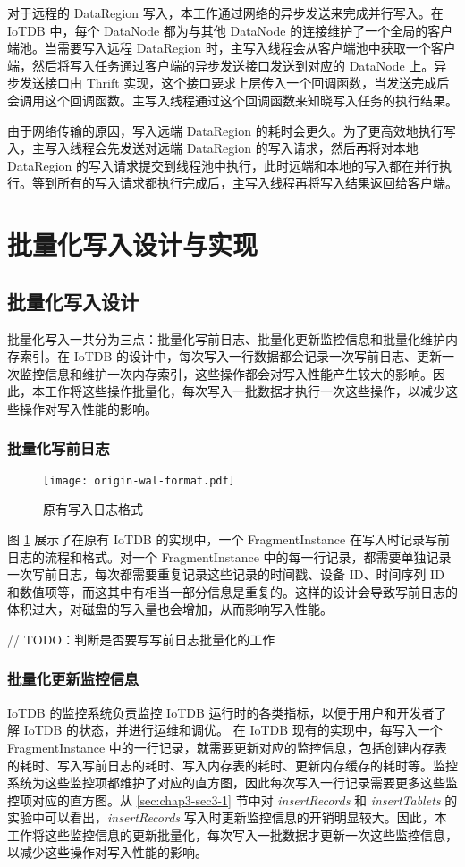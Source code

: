 对于远程的 DataRegion 写入，本工作通过网络的异步发送来完成并行写入。在 IoTDB 中，每个 DataNode 都为与其他 DataNode 的连接维护了一个全局的客户端池。当需要写入远程 DataRegion 时，主写入线程会从客户端池中获取一个客户端，然后将写入任务通过客户端的异步发送接口发送到对应的 DataNode 上。异步发送接口由 Thrift 实现，这个接口要求上层传入一个回调函数，当发送完成后会调用这个回调函数。主写入线程通过这个回调函数来知晓写入任务的执行结果。

由于网络传输的原因，写入远端 DataRegion 的耗时会更久。为了更高效地执行写入，主写入线程会先发送对远端 DataRegion 的写入请求，然后再将对本地 DataRegion 的写入请求提交到线程池中执行，此时远端和本地的写入都在并行执行。等到所有的写入请求都执行完成后，主写入线程再将写入结果返回给客户端。

\section{批量化写入设计与实现}
\subsection{批量化写入设计}
批量化写入一共分为三点：批量化写前日志、批量化更新监控信息和批量化维护内存索引。在 IoTDB 的设计中，每次写入一行数据都会记录一次写前日志、更新一次监控信息和维护一次内存索引，这些操作都会对写入性能产生较大的影响。因此，本工作将这些操作批量化，每次写入一批数据才执行一次这些操作，以减少这些操作对写入性能的影响。

\subsubsection{批量化写前日志}
\begin{figure}
  \centering
  \texttt{[image: origin-wal-format.pdf]}
  \caption{原有写入日志格式}
  \label{fig:origin-wal-format}
\end{figure}

图 \ref{fig:origin-wal-format} 展示了在原有 IoTDB 的实现中，一个 FragmentInstance 在写入时记录写前日志的流程和格式。对一个 FragmentInstance 中的每一行记录，都需要单独记录一次写前日志，每次都需要重复记录这些记录的时间戳、设备 ID、时间序列 ID 和数值项等，而这其中有相当一部分信息是重复的。这样的设计会导致写前日志的体积过大，对磁盘的写入量也会增加，从而影响写入性能。

// TODO：判断是否要写写前日志批量化的工作
\subsubsection{批量化更新监控信息}
 IoTDB 的监控系统负责监控 IoTDB 运行时的各类指标，以便于用户和开发者了解 IoTDB 的状态，并进行运维和调优。
 在 IoTDB 现有的实现中，每写入一个 FragmentInstance 中的一行记录，就需要更新对应的监控信息，包括创建内存表的耗时、写入写前日志的耗时、写入内存表的耗时、更新内存缓存的耗时等。监控系统为这些监控项都维护了对应的直方图，因此每次写入一行记录需要更多这些监控项对应的直方图。从 \ref{sec:chap3-sec3-1} 节中对 \emph{insertRecords} 和 \emph{insertTablets} 的实验中可以看出，\emph{insertRecords} 写入时更新监控信息的开销明显较大。因此，本工作将这些监控信息的更新批量化，每次写入一批数据才更新一次这些监控信息，以减少这些操作对写入性能的影响。

